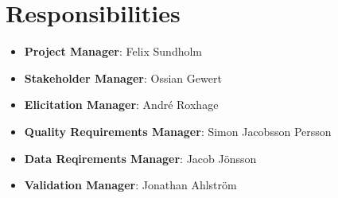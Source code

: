 \documentclass[a4paper]{article}
\begin{document}
\section{Responsibilities}
\begin{itemize}
    \item \textbf{Project Manager}: Felix Sundholm 
    \item\textbf{Stakeholder Manager}: Ossian Gewert
    \item\textbf{Elicitation Manager}: André Roxhage 
    \item\textbf{Quality Requirements Manager}: Simon Jacobsson Persson
    \item \textbf{Data Reqirements Manager}: Jacob Jönsson
    \item \textbf{Validation Manager}: Jonathan Ahlström
\end{itemize}
\end{document}
